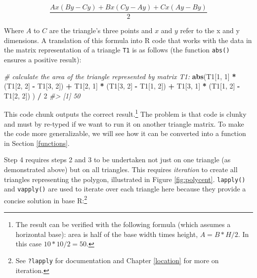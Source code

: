 \documentclass[]{krantz}
\newenvironment{Shaded}{\begin{snugshade}}{\end{snugshade}}
\newcommand{\CommentTok}[1]{\textcolor[rgb]{0.37,0.37,0.37}{\textit{#1}}}
\newcommand{\DecValTok}[1]{\textcolor[rgb]{0.06,0.06,0.06}{#1}}
\newcommand{\KeywordTok}[1]{\textcolor[rgb]{0.27,0.27,0.27}{\textbf{#1}}}
\newcommand{\NormalTok}[1]{#1}
\newcommand{\OperatorTok}[1]{\textcolor[rgb]{0.43,0.43,0.43}{\textbf{#1}}}
\newcommand{\StringTok}[1]{\textcolor[rgb]{0.5,0.5,0.5}{#1}}
\let\rmarkdownfootnote\footnote%
\def\footnote{\protect\rmarkdownfootnote}
\begin{document}
\[
\frac{Ax ( B y − C y ) + B x ( C y − A y ) + C x ( A y − B y )}
{ 2 }
\]

Where \(A\) to \(C\) are the triangle's three points and \(x\) and \(y\) refer to the x and y dimensions.
A translation of this formula into R code that works with the data in the matrix representation of a triangle \texttt{T1} is as follows (the function \texttt{abs()} ensures a positive result):

\begin{Shaded}
\begin{Highlighting}[]
\CommentTok{# calculate the area of the triangle represented by matrix T1:}
\KeywordTok{abs}\NormalTok{(T1[}\DecValTok{1}\NormalTok{, }\DecValTok{1}\NormalTok{] }\OperatorTok{*}\StringTok{ }\NormalTok{(T1[}\DecValTok{2}\NormalTok{, }\DecValTok{2}\NormalTok{] }\OperatorTok{-}\StringTok{ }\NormalTok{T1[}\DecValTok{3}\NormalTok{, }\DecValTok{2}\NormalTok{]) }\OperatorTok{+}
\StringTok{  }\NormalTok{T1[}\DecValTok{2}\NormalTok{, }\DecValTok{1}\NormalTok{] }\OperatorTok{*}\StringTok{ }\NormalTok{(T1[}\DecValTok{3}\NormalTok{, }\DecValTok{2}\NormalTok{] }\OperatorTok{-}\StringTok{ }\NormalTok{T1[}\DecValTok{1}\NormalTok{, }\DecValTok{2}\NormalTok{]) }\OperatorTok{+}
\StringTok{  }\NormalTok{T1[}\DecValTok{3}\NormalTok{, }\DecValTok{1}\NormalTok{] }\OperatorTok{*}\StringTok{ }\NormalTok{(T1[}\DecValTok{1}\NormalTok{, }\DecValTok{2}\NormalTok{] }\OperatorTok{-}\StringTok{ }\NormalTok{T1[}\DecValTok{2}\NormalTok{, }\DecValTok{2}\NormalTok{]) ) }\OperatorTok{/}\StringTok{ }\DecValTok{2}
\CommentTok{#> [1] 50}
\end{Highlighting}
\end{Shaded}

This code chunk outputs the correct result.\footnote{The result can be verified with the following formula (which assumes a horizontal base):
  area is half of the base width times height, \(A = B * H / 2\).
  In this case \(10 * 10 / 2 = 50\).}
The problem is that code is clunky and must by re-typed if we want to run it on another triangle matrix.
To make the code more generalizable, we will see how it can be converted into a function in Section \ref{functions}.

Step 4 requires steps 2 and 3 to be undertaken not just on one triangle (as demonstrated above) but on all triangles.
This requires \emph{iteration} to create all triangles representing the polygon, illustrated in Figure \ref{fig:polycent}.
\texttt{lapply()} and \texttt{vapply()} are used to iterate over each triangle here because they provide a concise solution in base R:\footnote{See \texttt{?lapply} for documentation and Chapter \ref{location} for more on iteration.}
\end{document}
